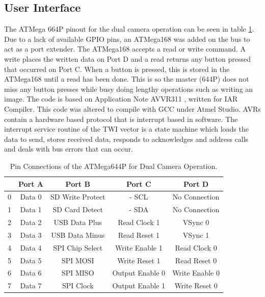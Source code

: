 \subsection{User Interface}
The ATMega 664P pinout for the dual camera operation can be seen in table \ref{table:644Pin}. Due to a lack of available GPIO pins, an ATMega168 was added on the \itc bus to act as a port extender. The ATMega168 accepts a read or write command. A write places the written data on Port D and a read returns any button pressed that occurred on Port C. When a button is pressed, this is stored in the ATMega168 until a read has been done. This is so the master (644P) does not miss any button presses while busy doing lengthy operations such as writing an image. The code is based on Application Note AVVR311 \citep{Atmel:I2CSlave}, written for IAR Compiler. This code was altered to compile with GCC under Atmel Studio. AVRs contain a hardware based \itc protocol that is interrupt based in software. The interrupt service routine of the TWI vector is a state machine which loads the data to send, stores received data, responds to acknowledges and address calls and deals with bus errors that can occur.

\begin{table}
\centering
\begin{tabular}{|c|c|c|c|c|}\hline
	& 	Port A 	& 	Port B 			& 	Port C 				& 	Port D 		\\ \hline
0	&	Data 0	&	SD Write Protect&	\itc - SCL			&	No Connection	\\
1	&	Data 1	&	SD Card Detect	&	\itc - SDA			&	No Connection	\\
2	&	Data 2	&	USB Data Plus	&	Read Clock 1		&	VSync 0			\\
3	&	Data 3	&	USB Data Minus	&	Read Reset 1		&	VSync 1			\\
4	&	Data 4	&	SPI Chip Select	&	Write Enable 1		&	Read Clock 0	\\
5	&	Data 5	&	SPI	MOSI 		&	Write Reset 1		&	Read Reset 0	\\
6	&	Data 6	&	SPI MISO		&	Output Enable 0		&	Write Enable 0	\\
7	&	Data 7	&	SPI Clock		&	Output Enable 1		&	Write Reset 0	\\
\hline

\end{tabular}
\caption{Pin Connections of the ATMega644P for Dual Camera Operation.}
\label{table:644Pin}
\end{table}
